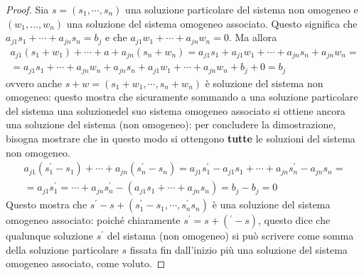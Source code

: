 \begin{proof}
  Sia $s=(s_1,\cdots, s_n)$ una soluzione particolare del sistema non
  omogeneo e\\ $(w_1,\dots,w_n)$ una soluzione del sistema omogeneo
  associato. Questo significa che $a_{j1}s_1+\cdots+a_{jn}s_n=b_j$ e
  che $a_{j1}w_1+\cdots+a_{jn}w_{n}=0$. Ma allora
  \begin{eqnarray*}
    a_{j1}(s_1+w_1)+\cdots+a+a_{jn}(s_n+w_n)=a_{j1}s_1+a_{j1}w_1+\cdots+a_{jn}s_n+a_{jn}w_n=\\
    =a_{j1}s_1+\cdots+a_{jn}w_n+a_{jn}s_n+a_{j1}w_1+\cdots+a_{jn}w_n+b_j+0=b_j
  \end{eqnarray*}
  ovvero anche $s+w=(s_1+w_1,\cdots,s_n+w_n)$ è soluzione del sistema non
  omogeneo: questo mostra che sicuramente sommando a una soluzione
  particolare del sistema una soluzionedel suo sistema omogeneo associato
  si ottiene ancora una soluzione del sistema (non omogeneo): per concludere
  la dimostrazione, bisogna mostrare che in questo modo si ottengono
  \textbf{tutte} le soluzioni del sistema non omogeneo.
  \begin{eqnarray*}
    a_{j1}(s_1^\prime-s_1)+\cdots+a_{jn}(s_n^\prime-s_n)=a_{j1}s_1^\prime-a_{j1}s_1+\cdots+a_{jn}s_n^\prime
    -a_{jn}s_n=\\
    =a_{j1}s_1^\prime=\cdots+a_{jn}s_n^\prime-(a_{j1}s_1+\cdots+a_{jn}s_n)=b_j-b_j=0
  \end{eqnarray*}
  Questo mostra che $s^\prime-s+(s_1^\prime-s_1,\cdots,s_n^\prime s_n)$ è una
  soluzione del sistema omogeneo associato: poiché chiaramente
  $s^\prime=s+(^\prime-s)$, questo dice che qualunque soluzione $s^\prime$ del
  sistama (non omogeneo) si può scrivere come somma della soluzione particolare
  $s$ fissata fin dall'inizio più una soluzione del sistema omogeneo associato,
  come voluto.
\end{proof}
